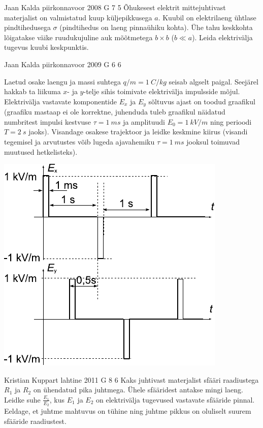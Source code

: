 \documentclass[11pt]{article}
\begin{document}
{%
{Jaan Kalda} %
{piirkonnavoor} %
{2008} %
{G 7} %
{5} %
{
\ifStatement
Õhukesest elektrit mittejuhtivast materjalist on valmistatud kuup küljepikkusega $a$. Kuubil on elektrilaeng ühtlase pindtihedusega $\sigma$ (pindtihedus on laeng pinnaühiku kohta). Ühe tahu keskkohta lõigatakse väike ruudukujuline auk mõõtmetega $b \times b$ ($b \ll a$). Leida elektrivälja tugevus kuubi keskpunktis.
\fi
}

{Jaan Kalda} %
{piirkonnavoor} %
{2009} %
{G 6} %
{6} %
{
\ifStatement
Laetud osake laengu ja massi suhtega $q/m = \SI{1}{C/kg}$ seisab algselt paigal. Seejärel hakkab ta liikuma $x$- ja $y$-telje sihis
toimivate elektrivälja impulsside mõjul. Elektrivälja vastavate komponentide $E_x$ ja $E_y$ sõltuvus ajast on toodud graafikul (graafiku mastaap
ei ole korrektne, juhenduda tuleb graafikul näidatud numbritest impulsi
kestvuse $\tau = \SI{1}{ms}$ ja amplituudi $E_0 = \SI{1}{kV/m}$ ning perioodi $T = \SI{2}{s}$
jaoks). Visandage osakese trajektoor ja leidke keskmine kiirus (visandi tegemisel ja arvutustes võib lugeda ajavahemiku $\tau = \SI{1}{ms}$ jooksul
toimuvad muutused hetkelisteks). 

\begin{center}
	\includegraphics[width=0.6\linewidth]{2009-v2g-06-yl}
\end{center}
\fi
}

{Kristian Kuppart} %
{lahtine} %
{2011} %
{G 8} %
{6} %
{
\ifStatement
Kaks juhtivast materjalist sfääri raadiustega $R_1$ ja $R_2$ on ühendatud pika 
juhtmega. Ühele sfääridest antakse mingi laeng. Leidke suhe $\frac{E_1}{E_2}$, kus
$E_1$ ja $E_2$ on elektrivälja tugevused vastavate sfääride pinnal. Eeldage, et
juhtme mahtuvus on tühine ning juhtme pikkus on oluliselt suurem sfääride
raadiustest.
\fi
}

}
\end{document}
